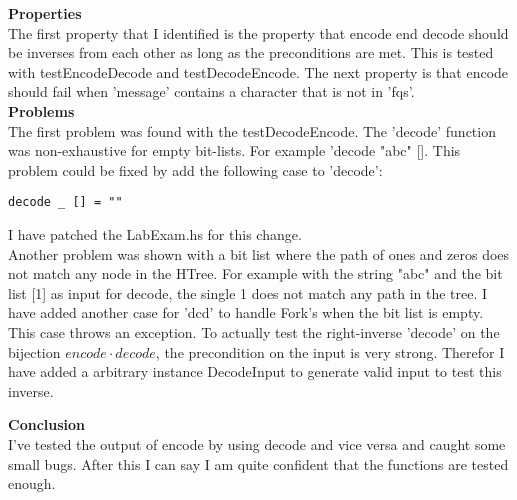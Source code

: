 \noindent
\textbf{Properties} \\
The first property that I identified is the property that encode end decode should be inverses from each other as long as the preconditions are met. This is tested with testEncodeDecode and testDecodeEncode.
The next property is that encode should fail when 'message' contains a character that is not in 'fqs'. \\

\noindent
\textbf{Problems} \\
The first problem was found with the testDecodeEncode. The 'decode' function was non-exhaustive for empty bit-lists. For example 'decode "abc" [].
This problem could be fixed by add the following case to 'decode': \\

\begin{lstlisting}
decode _ [] = ""
\end{lstlisting}

\noindent
I have patched the LabExam.hs for this change. \\

\noindent
Another problem was shown with a bit list where the path of ones and zeros does not match any node in the HTree.
For example with the string "abc" and the bit list [1] as input for decode, the single 1 does not match any path in the tree.
I have added another case for 'dcd' to handle Fork's when the bit list is empty. This case throws an exception.
To actually test the right-inverse 'decode' on the bijection $encode \cdot decode$, the precondition on the input is very strong.
Therefor I have added a arbitrary instance DecodeInput to generate valid input to test this inverse.

\noindent
\textbf{Conclusion} \\
I've tested the output of encode by using decode and vice versa and caught some small bugs. After this I can say I am quite confident that the functions are tested enough.
